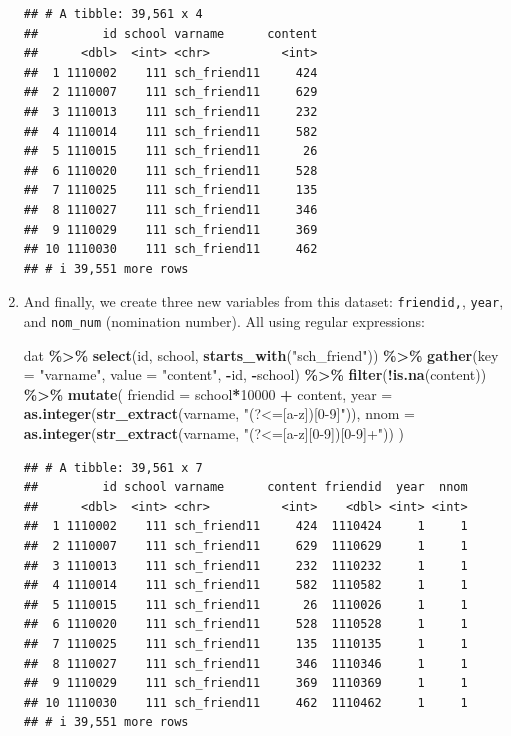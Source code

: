 \documentclass[
]{book}
\newenvironment{Shaded}{\begin{snugshade}}{\end{snugshade}}
\newcommand{\AttributeTok}[1]{\textcolor[rgb]{0.13,0.29,0.53}{#1}}
\newcommand{\DecValTok}[1]{\textcolor[rgb]{0.00,0.00,0.81}{#1}}
\newcommand{\FunctionTok}[1]{\textcolor[rgb]{0.13,0.29,0.53}{\textbf{#1}}}
\newcommand{\NormalTok}[1]{#1}
\newcommand{\SpecialCharTok}[1]{\textcolor[rgb]{0.81,0.36,0.00}{\textbf{#1}}}
\newcommand{\StringTok}[1]{\textcolor[rgb]{0.31,0.60,0.02}{#1}}
\begin{document}
\begin{enumerate}
\begin{verbatim}
## # A tibble: 39,561 x 4
##         id school varname      content
##      <dbl>  <int> <chr>          <int>
##  1 1110002    111 sch_friend11     424
##  2 1110007    111 sch_friend11     629
##  3 1110013    111 sch_friend11     232
##  4 1110014    111 sch_friend11     582
##  5 1110015    111 sch_friend11      26
##  6 1110020    111 sch_friend11     528
##  7 1110025    111 sch_friend11     135
##  8 1110027    111 sch_friend11     346
##  9 1110029    111 sch_friend11     369
## 10 1110030    111 sch_friend11     462
## # i 39,551 more rows
\end{verbatim}
\item
  And finally, we create three new variables from this dataset: \texttt{friendid,}, \texttt{year}, and \texttt{nom\_num} (nomination number). All using regular expressions:

\begin{Shaded}
\begin{Highlighting}[]
\NormalTok{dat }\SpecialCharTok{\%\textgreater{}\%} 
  \FunctionTok{select}\NormalTok{(id, school, }\FunctionTok{starts\_with}\NormalTok{(}\StringTok{"sch\_friend"}\NormalTok{)) }\SpecialCharTok{\%\textgreater{}\%}
  \FunctionTok{gather}\NormalTok{(}\AttributeTok{key =} \StringTok{"varname"}\NormalTok{, }\AttributeTok{value =} \StringTok{"content"}\NormalTok{, }\SpecialCharTok{{-}}\NormalTok{id, }\SpecialCharTok{{-}}\NormalTok{school) }\SpecialCharTok{\%\textgreater{}\%}
  \FunctionTok{filter}\NormalTok{(}\SpecialCharTok{!}\FunctionTok{is.na}\NormalTok{(content)) }\SpecialCharTok{\%\textgreater{}\%}
  \FunctionTok{mutate}\NormalTok{(}
    \AttributeTok{friendid =}\NormalTok{ school}\SpecialCharTok{*}\DecValTok{10000} \SpecialCharTok{+}\NormalTok{ content,}
    \AttributeTok{year     =} \FunctionTok{as.integer}\NormalTok{(}\FunctionTok{str\_extract}\NormalTok{(varname, }\StringTok{"(?\textless{}=[a{-}z])[0{-}9]"}\NormalTok{)),}
    \AttributeTok{nnom     =} \FunctionTok{as.integer}\NormalTok{(}\FunctionTok{str\_extract}\NormalTok{(varname, }\StringTok{"(?\textless{}=[a{-}z][0{-}9])[0{-}9]+"}\NormalTok{))}
\NormalTok{    )}
\end{Highlighting}
\end{Shaded}

\begin{verbatim}
## # A tibble: 39,561 x 7
##         id school varname      content friendid  year  nnom
##      <dbl>  <int> <chr>          <int>    <dbl> <int> <int>
##  1 1110002    111 sch_friend11     424  1110424     1     1
##  2 1110007    111 sch_friend11     629  1110629     1     1
##  3 1110013    111 sch_friend11     232  1110232     1     1
##  4 1110014    111 sch_friend11     582  1110582     1     1
##  5 1110015    111 sch_friend11      26  1110026     1     1
##  6 1110020    111 sch_friend11     528  1110528     1     1
##  7 1110025    111 sch_friend11     135  1110135     1     1
##  8 1110027    111 sch_friend11     346  1110346     1     1
##  9 1110029    111 sch_friend11     369  1110369     1     1
## 10 1110030    111 sch_friend11     462  1110462     1     1
## # i 39,551 more rows
\end{verbatim}


\end{enumerate}
\end{document}
